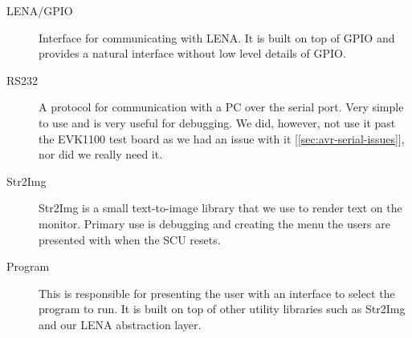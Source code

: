 \begin{description}
\item[LENA/GPIO] Interface for communicating with \ac{LENA}. It is built on
  top of GPIO and provides a natural interface without low level details of GPIO.


\item[RS232] A protocol for communication with a PC over the serial port. Very
  simple to use and is very useful for debugging. We did, however, 
	not use it past the EVK1100 test board as we had an issue with it
	[\ref{sec:avr-serial-issues}], nor did we really need it.



\item[Str2Img] Str2Img is a small text-to-image library that we use to render
  text on the monitor. Primary use is debugging and creating the menu the users
  are presented with when the SCU resets.
  
\item[Program] This is responsible for presenting the user with an interface to
  select the program to run. It is built on top of other utility libraries such
  as Str2Img and our \ac{LENA} abstraction layer.



\end{description}
